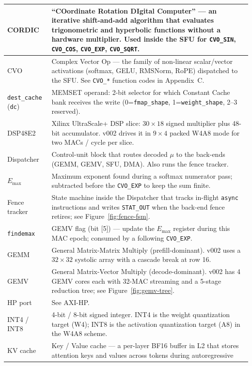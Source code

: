 \documentclass[11pt,a4paper,twoside,openany]{report}
\providecommand{\uops}{\ensuremath{\mu}\text{ops}\xspace}
\begin{document}
\begin{longtable}{|>{\raggedright\arraybackslash}p{3.8cm}|p{11.8cm}|}
\hline
CORDIC & ``COordinate Rotation DIgital Computer'' --- an iterative
shift-and-add algorithm that evaluates trigonometric and hyperbolic
functions without a hardware multiplier.  Used inside the SFU for
\texttt{CVO\_SIN}, \texttt{CVO\_COS}, \texttt{CVO\_EXP},
\texttt{CVO\_SQRT}. \\
\hline
CVO & Complex Vector Op --- the family of non-linear scalar/vector
activations (softmax, GELU, RMSNorm, RoPE) dispatched to the SFU.
See \texttt{CVO\_*} function codes in Appendix~C. \\
\hline
\texttt{dest\_cache} (\texttt{dc}) & MEMSET operand: 2-bit selector for
which Constant Cache bank receives the write
(0=\texttt{fmap\_shape}, 1=\texttt{weight\_shape}, 2--3 reserved). \\
\hline
DSP48E2 & Xilinx UltraScale+ DSP slice: $30 \times 18$ signed multiplier
plus 48-bit accumulator.  v002 drives it in $9 \times 4$ packed W4A8
mode for two MACs / cycle per slice. \\
\hline
Dispatcher & Control-unit block that routes decoded \uops to the
back-ends (GEMM, GEMV, SFU, DMA).  Also runs the fence tracker. \\
\hline
$E_{\max}$ & Maximum exponent found during a softmax numerator pass;
subtracted before the \texttt{CVO\_EXP} to keep the sum finite. \\
\hline
Fence tracker & State machine inside the Dispatcher that tracks
in-flight \texttt{async} instructions and writes
\texttt{STAT\_OUT} when the back-end fence retires; see
Figure~\ref{fig:fence-fsm}. \\
\hline
\texttt{findemax} & GEMV flag (bit [5]) --- update the $E_{\max}$
register during this MAC epoch; consumed by a following
\texttt{CVO\_EXP}. \\
\hline
GEMM & General Matrix-Matrix Multiply (prefill-dominant).  v002 uses a
$32 \times 32$ systolic array with a cascade break at row 16. \\
\hline
GEMV & General Matrix-Vector Multiply (decode-dominant).  v002 has
4 GEMV cores each with 32-MAC streaming and a 5-stage reduction tree;
see Figure~\ref{fig:gemv-tree}. \\
\hline
HP port & See AXI-HP. \\
\hline
INT4 / INT8 & 4-bit / 8-bit signed integer.  INT4 is the weight
quantization target (W4); INT8 is the activation quantization target
(A8) in the W4A8 scheme. \\
\hline
KV cache & Key / Value cache --- a per-layer BF16 buffer in L2 that
stores attention keys and values across tokens during autoregressive

\end{longtable}
\end{document}
